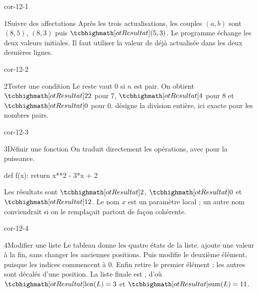 \corrigesSouples

\begin{blocLivre}{cor-12-1}
\begin{corrige}{1}{Suivre des affectations}
Après les trois actualisations, les couples $(a,b)$ sont $(8,5)$, $(8,3)$ puis $\res{(5,3)}$. Le programme échange les deux valeurs initiales. Il faut utiliser la valeur de  déjà actualisée dans les deux dernières lignes.
\label{figlivre-r12-01-trace-cor}

\end{corrige}
\end{blocLivre}
\begin{blocLivre}{cor-12-2}
\begin{corrige}{2}{Tester une condition}
Le reste  vaut 0 si $n$ est pair. On obtient $\res{22}$ pour 7, $\res{4}$ pour 8 et $\res{0}$ pour 0. \code{//} désigne la division entière, ici exacte pour les nombres pairs.
\end{corrige}
\end{blocLivre}
\begin{blocLivre}{cor-12-3}
\begin{corrige}{3}{Définir une fonction}
On traduit directement les opérations, avec \code{**} pour la puissance.
\begin{python}
def f(x):
    return x**2 - 3*x + 2
\end{python}
Les résultats sont $\res{2}$, $\res{0}$ et $\res{12}$. Le nom $x$ est un paramètre local ; un autre nom conviendrait si on le remplaçait partout de façon cohérente.
\end{corrige}
\end{blocLivre}
\begin{blocLivre}{cor-12-4}
\begin{corrige}{4}{Modifier une liste}
Le tableau donne les quatre états de la liste.
 ajoute une valeur à la fin, sans changer les anciennes positions.
Puis  modifie le deuxième élément, puisque les indices commencent à 0.
Enfin  retire le premier élément ; les autres sont décalés d’une position.
La liste finale est \code{[5, 4, 2]}, d’où $\res{\operatorname{len}(L)=3}$ et $\res{\operatorname{sum}(L)=11}$.

\label{figlivre-r12-04-trace-cor}

\end{corrige}
\end{blocLivre}
